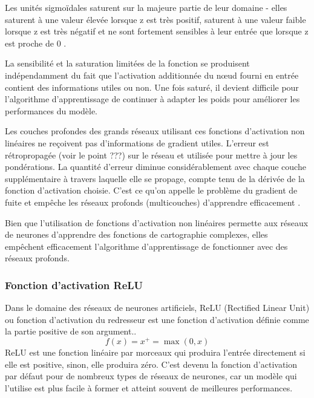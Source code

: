 	 Les unités sigmoïdales saturent sur la majeure partie de leur domaine - elles saturent à une valeur élevée lorsque z est très positif, saturent à une valeur faible lorsque z est très négatif et ne sont fortement sensibles à leur entrée que lorsque z est proche de 0 \cite{ml2008python}.
	 
	 La sensibilité et la saturation limitées de la fonction se produisent indépendamment du fait que l'activation additionnée du nœud fourni en entrée contient des informations utiles ou non. Une fois saturé, il devient difficile pour l'algorithme d'apprentissage de continuer à adapter les poids pour améliorer les performances du modèle.
	 
	 Les couches profondes des grands réseaux utilisant ces fonctions d'activation non linéaires ne reçoivent pas d'informations de gradient utiles. L'erreur est rétropropagée (voir le point ???) sur le réseau et utilisée pour mettre à jour les pondérations. La quantité d'erreur diminue considérablement avec chaque couche supplémentaire à travers laquelle elle se propage, compte tenu de la dérivée de la fonction d'activation choisie. C'est ce qu'on appelle le problème du gradient de fuite et empêche les réseaux profonds (multicouches) d'apprendre efficacement \cite{geron2017hands}.
	 
	 Bien que l'utilisation de fonctions d'activation non linéaires permette aux réseaux de neurones d'apprendre des fonctions de cartographie complexes, elles empêchent efficacement l'algorithme d'apprentissage de fonctionner avec des réseaux profonds.
	 
	 
	
	
	
	\subsubsection{Fonction d'activation ReLU}
	
	Dans le domaine des réseaux de neurones artificiels, ReLU (Rectified Linear Unit) ou fonction d'activation du redresseur est une fonction d'activation définie comme la partie positive de son argument\cite{goodfellow2016deep}..
	$${\displaystyle f(x)=x^{+}=\max(0,x)}$$
	ReLU est une fonction linéaire par morceaux qui produira l'entrée directement si elle est positive, sinon, elle produira zéro. C'est devenu la fonction d'activation par défaut pour de nombreux types de réseaux de neurones, car un modèle qui l'utilise est plus facile à former et atteint souvent de meilleures performances\cite{géron2017hands}.
	
